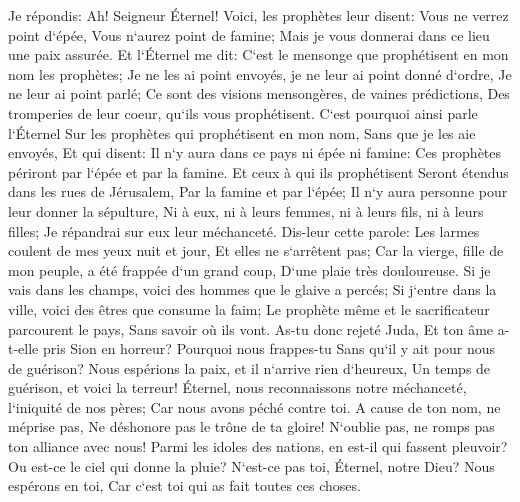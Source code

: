 \verse Je répondis: Ah! Seigneur Éternel! Voici, les prophètes leur disent: Vous ne verrez point d`épée, Vous n`aurez point de famine; Mais je vous donnerai dans ce lieu une paix assurée. 
\verse Et l`Éternel me dit: C`est le mensonge que prophétisent en mon nom les prophètes; Je ne les ai point envoyés, je ne leur ai point donné d`ordre, Je ne leur ai point parlé; Ce sont des visions mensongères, de vaines prédictions, Des tromperies de leur coeur, qu`ils vous prophétisent. 
\verse C`est pourquoi ainsi parle l`Éternel Sur les prophètes qui prophétisent en mon nom, Sans que je les aie envoyés, Et qui disent: Il n`y aura dans ce pays ni épée ni famine: Ces prophètes périront par l`épée et par la famine. 
\verse Et ceux à qui ils prophétisent Seront étendus dans les rues de Jérusalem, Par la famine et par l`épée; Il n`y aura personne pour leur donner la sépulture, Ni à eux, ni à leurs femmes, ni à leurs fils, ni à leurs filles; Je répandrai sur eux leur méchanceté. 
\verse Dis-leur cette parole: Les larmes coulent de mes yeux nuit et jour, Et elles ne s`arrêtent pas; Car la vierge, fille de mon peuple, a été frappée d`un grand coup, D`une plaie très douloureuse. 
\verse Si je vais dans les champs, voici des hommes que le glaive a percés; Si j`entre dans la ville, voici des êtres que consume la faim; Le prophète même et le sacrificateur parcourent le pays, Sans savoir où ils vont. 
\verse As-tu donc rejeté Juda, Et ton âme a-t-elle pris Sion en horreur? Pourquoi nous frappes-tu Sans qu`il y ait pour nous de guérison? Nous espérions la paix, et il n`arrive rien d`heureux, Un temps de guérison, et voici la terreur! 
\verse Éternel, nous reconnaissons notre méchanceté, l`iniquité de nos pères; Car nous avons péché contre toi. 
\verse A cause de ton nom, ne méprise pas, Ne déshonore pas le trône de ta gloire! N`oublie pas, ne romps pas ton alliance avec nous! 
\verse Parmi les idoles des nations, en est-il qui fassent pleuvoir? Ou est-ce le ciel qui donne la pluie? N`est-ce pas toi, Éternel, notre Dieu? Nous espérons en toi, Car c`est toi qui as fait toutes ces choses. 

